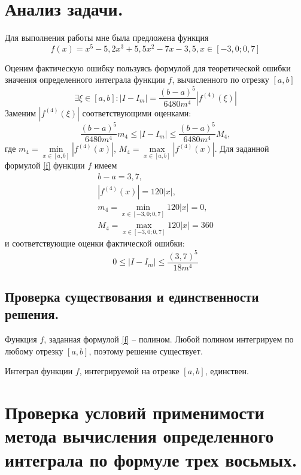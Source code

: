 \documentclass[a4paper, 12pt]{article}
\begin{document}
	\section{Анализ задачи.}
	
	Для выполнения работы мне была предложена функция
	\begin{equation} \label{f}
		f(x)=x^5-5,2x^3+5,5x^2-7x-3,5, x\in[-3,0;0,7]
	\end{equation}
	
	Оценим фактическую ошибку пользуясь формулой для теоретической ошибки значения определенного интеграла функции $f$, вычисленного по отрезку $[a,b]$
	\begin{equation}
		\exists\xi\in[a,b]:|I-I_m|=\frac{(b-a)^5}{6480m^4}|f^{(4)}(\xi)|
	\end{equation}
	Заменим $|f^{(4)}(\xi)|$ соответствующими оценками:
	\begin{equation}
		\frac{(b-a)^5}{6480m^4}m_4 \leq |I-I_m| \leq \frac{(b-a)^5}{6480m^4}M_4,
	\end{equation}
	где $m_4=\min\limits_{x\in[a,b]}|f^{(4)}(x)|$, $M_4=\max\limits_{x\in[a,b]}|f^{(4)}(x)|$. Для заданной формулой \eqref{f} функции $f$ имеем
	\begin{equation*} 
		\begin{gathered}
			b-a=3,7,\\
			|f^{(4)}(x)|=120|x|,\\
			m_4=\min\limits_{x\in[-3,0;0,7]}120|x|=0,\\
			M_4=\max\limits_{x\in[-3,0;0,7]}120|x|=360
		\end{gathered}
	\end{equation*}
	и соответствующие оценки фактической ошибки:
	\begin{equation}
		0 \leq |I-I_m| \leq \frac{(3,7)^5}{18m^4}
	\end{equation}
	
	\subsection{Проверка существования и единственности решения.}
	\label{solexistance}
	
	Функция $f$, заданная формулой \eqref{f} -- полином. Любой полином интегрируем по любому отрезку $[a,b]$, поэтому решение существует.
	
	Интеграл функции $f$, интегрируемой на отрезке $[a,b]$, единствен.
	
	\section{Проверка условий применимости метода вычисления определенного интеграла по формуле трех восьмых.}
	
\end{document}

